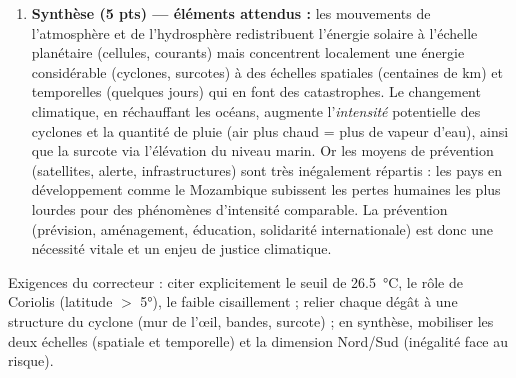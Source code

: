 \documentclass[11pt]{article}
\begin{document}
\begin{corrige}
\begin{enumerate}
    \begin{itemize}
        \item \emph{Prévision/alerte (3 mesures, 1,5 pt) :} surveillance satellitaire et radars couplée à la modélisation numérique de trajectoire ; système d'alerte précoce multicanal (radio, SMS, sirènes) en langues locales ; exercices d'évacuation et plans d'urgence communaux testés chaque saison cyclonique.
        \item \emph{Aménagement (2 mesures, 2 pts) :} digues et surélévation des défenses côtières + restauration des \textbf{mangroves} (écran naturel dissipant la houle) ; interdiction de construire dans les zones inondables et normes parasismiques/paracycloniques (toits ancrés, bâtiments-refuges surélevés).
        \item \emph{Préparation des populations (2 mesures, 1,5 pt) :} éducation aux risques (réflexes, itinéraires d'évacuation, kits d'urgence) ; organisation communautaire de secours (stocks d'eau potable, vivres, postes de santé de fortune).
    \end{itemize}
    \item \textbf{Synthèse (5 pts) — éléments attendus :} les mouvements de l'atmosphère et de l'hydrosphère redistribuent l'énergie solaire à l'échelle planétaire (cellules, courants) mais concentrent localement une énergie considérable (cyclones, surcotes) à des échelles spatiales (centaines de km) et temporelles (quelques jours) qui en font des catastrophes. Le changement climatique, en réchauffant les océans, augmente l'\emph{intensité} potentielle des cyclones et la quantité de pluie (air plus chaud = plus de vapeur d'eau), ainsi que la surcote via l'élévation du niveau marin. Or les moyens de prévention (satellites, alerte, infrastructures) sont très inégalement répartis : les pays en développement comme le Mozambique subissent les pertes humaines les plus lourdes pour des phénomènes d'intensité comparable. La prévention (prévision, aménagement, éducation, solidarité internationale) est donc une nécessité vitale et un enjeu de justice climatique.
\end{enumerate}
\end{corrige}

\begin{attention}
Exigences du correcteur : citer explicitement le seuil de \SI{26,5}{\celsius}, le rôle de Coriolis (latitude $>$ 5°), le faible cisaillement ; relier chaque dégât à une structure du cyclone (mur de l'œil, bandes, surcote) ; en synthèse, mobiliser les deux échelles (spatiale et temporelle) et la dimension Nord/Sud (inégalité face au risque).
\end{attention}
\end{document}
